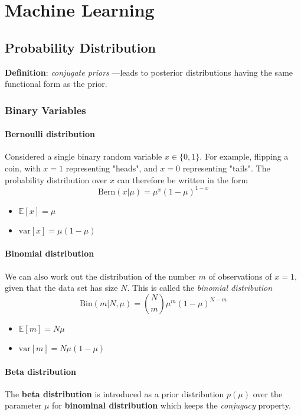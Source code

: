 \documentclass[a4paper, 12pt]{book} %
\begin{document}
\part{Machine Learning}
\chapter{Probability Distribution}
\textbf{Definition}: \emph{conjugate priors} ---leads to posterior distributions having the same functional form as the prior.
\section{Binary Variables}
\subsection{Bernoulli distribution}
Considered a single binary random variable $x \in \{0, 1\}$. For example, flipping a coin, with $x = 1$ representing "heads", and $x = 0$ representing "tails". The probability distribution over $x$ can therefore be written in the form 
\begin{equation}
\mathrm{Bern}(x|\mu) = \mu^{x}(1-\mu)^{1-x}
\end{equation}
\begin{itemize}
	\item $\mathbb{E}[x]=\mu$
	\item $\mathrm{var}[x]=\mu(1-\mu)$
\end{itemize}
\subsection{Binomial distribution}
We can also work out the distribution of the number $m$ of observations of $x = 1$, given that the data set has size $N$. This is called the \emph{binomial distribution}
\begin{equation}
\mathrm{Bin}{(m|N,\mu)}=\binom{N}{m} \mu^m(1-\mu)^{N-m}
\end{equation}
\begin{itemize}
	\item $\mathbb{E}[m]=N\mu$
	\item $\mathrm{var}[m]=N\mu(1-\mu)$
\end{itemize}


\subsection{Beta distribution}
The \textbf{beta distribution} is introduced as a prior distribution $p(\mu)$ over the parameter $\mu$ for \textbf{binominal distribution} which keeps the \emph{conjugacy} property.
\end{document}
